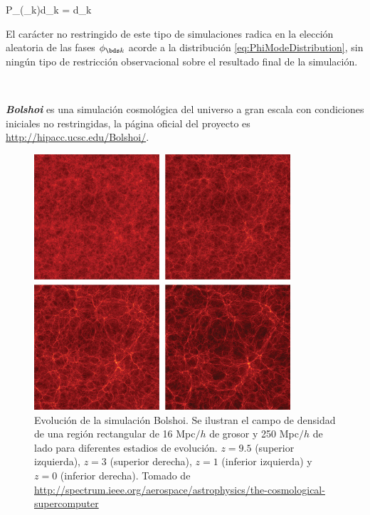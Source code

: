 { P_\phi(\phi_{\bds k})d\phi_{\bds k} = d\phi_{\bds k} }


El carácter no restringido de este tipo de simulaciones radica en la 
elección aleatoria de las fases $\phi_{\bds k}$ acorde a la distribución
\ref{eq:PhiModeDistribution}, sin ningún tipo de restricción observacional
sobre el resultado final de la simulación.

\

\textbf{\textit{Bolshoi}} es una simulación cosmológica del universo 
a gran escala con condiciones iniciales no restringidas, la página 
oficial del proyecto es \url{http://hipacc.ucsc.edu/Bolshoi/}. 

\newpage
\begin{figure}[htbp]
	\centering
	\includegraphics[width=0.85\textwidth]
	{./figures/3_nbody_simulations/Bolshoi_Evolution.png}

	\caption{\small{Evolución de la simulación Bolshoi. Se ilustran el
	campo de densidad de una región rectangular de 16 Mpc$/h$ de grosor y 
	250 Mpc$/h$	de lado para diferentes estadios de evolución. $z=9.5$ 
	(superior izquierda), $z=3$ (superior derecha), $z=1$ (inferior 
	izquierda) y $z=0$ (inferior derecha). Tomado de 
	\url{http://spectrum.ieee.org/aerospace/astrophysics/the-cosmological-supercomputer} }}
	
	\label{fig:Bolshoi_Evolution}
\end{figure}


